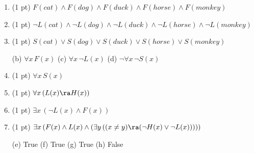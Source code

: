 \begin{questions}
\begin{enumerate}[label=(\alph*)]
  \item (1 pt)  \hspace*{0.15in}$F(cat) \wedge F(dog) \wedge F(duck) \wedge F(horse) \wedge F(monkey)$
  \item (1 pt)  \hspace*{0.15in}$\neg L(cat) \wedge \neg L(dog) \wedge \neg L(duck) \wedge \neg L(horse) \wedge \neg L(monkey) $
  \item (1 pt)  \hspace*{0.15in}$S(cat) \vee S(dog) \vee S(duck) \vee S(horse) \vee S(monkey)$
      \begin{solution}
        (b) $\forall x\, F(x)$
        \hspace*{0.5in} (c) $\forall x\, \neg L(x)$
        \hspace*{0.5in} (d) $\neg \forall x\, \neg S(x)$ 
      \end{solution}

  \item (1 pt) \hspace*{0.15in}  $\forall x\, S(x)$ 
  \item (1 pt) \hspace*{0.15in} $\forall x\, (L(x) \ra H(x))$
  \item (1 pt) \hspace*{0.15in} $\exists x\, (\neg L(x) \wedge F(x)) $
  \item (1 pt) \hspace*{0.15in} $\exists x\, (F(x) \wedge L(x) \wedge (\exists y\, ((x \neq y)  \ra (\neg H(x) \vee \neg L(x)))))$
    \begin{solution}
      (e) True 
      \hspace*{0.15in} (f) True 
      \hspace*{0.15in} (g) True
      \hspace*{0.15in} (h) False
    \end{solution}

\end{enumerate}


\end{questions}
